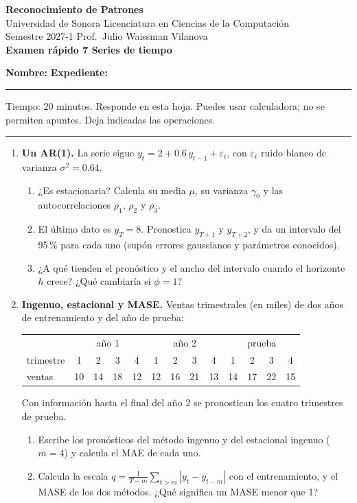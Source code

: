 \documentclass[11pt]{article}
\newcommand{\encabezado}[2]{%
\begin{center}
{\large\bfseries Reconocimiento de Patrones}\\[2pt]
Universidad de Sonora \textperiodcentered{} Licenciatura en Ciencias de la Computación\\
Semestre 2027-1 \textperiodcentered{} Prof.\ Julio Waissman Vilanova\\[10pt]
{\Large\bfseries #1}%
\ifdefined\tipodoc\\[4pt]{\large\itshape\tipodoc}\fi
\end{center}
\ifdefined\tipodoc\else
\vspace{6pt}
\textbf{Nombre:} \hrulefill\quad \textbf{Expediente:} \rule{3.5cm}{0.4pt}\par
\vspace{6pt}
\fi
#2
\par\medskip\hrule\medskip
}
\newcommand{\espacio}[1]{\par\vspace{#1}}
\newcommand{\nuevapagina}{\newpage}
\begin{document}
\encabezado{Examen rápido 7 \textperiodcentered{} Series de tiempo}{%
Tiempo: 20 minutos. Responde en esta hoja. Puedes usar calculadora; no se permiten apuntes. Deja indicadas las operaciones.}

\begin{enumerate}

\item \textbf{Un AR(1).} La serie sigue $y_t = 2 + 0.6\, y_{t-1} + \varepsilon_t$, con $\varepsilon_t$ ruido blanco de varianza $\sigma^2 = 0.64$.
\begin{enumerate}
  \item ¿Es estacionaria? Calcula su media $\mu$, su varianza $\gamma_0$ y las autocorrelaciones $\rho_1$, $\rho_2$ y $\rho_3$.
  \espacio{3.2cm}

  \item El último dato es $y_T = 8$. Pronostica $y_{T+1}$ y $y_{T+2}$, y da un intervalo del 95\,\% para cada uno (supón errores gaussianos y parámetros conocidos).
  \espacio{3.5cm}

  \item ¿A qué tienden el pronóstico y el ancho del intervalo cuando el horizonte $h$ crece? ¿Qué cambiaría si $\phi = 1$?
  \espacio{2.2cm}
\end{enumerate}

\nuevapagina
\item \textbf{Ingenuo, estacional y MASE.} Ventas trimestrales (en miles) de dos años de entrenamiento y del año de prueba:
\begin{center}
\begin{tabular}{l|cccc|cccc|cccc}
 & \multicolumn{4}{c|}{año 1} & \multicolumn{4}{c|}{año 2} & \multicolumn{4}{c}{prueba} \\
trimestre & 1 & 2 & 3 & 4 & 1 & 2 & 3 & 4 & 1 & 2 & 3 & 4 \\ \hline
ventas & 10 & 14 & 18 & 12 & 12 & 16 & 21 & 13 & 14 & 17 & 22 & 15
\end{tabular}
\end{center}
Con información hasta el final del año 2 se pronostican los cuatro trimestres de prueba.
\begin{enumerate}
  \item Escribe los pronósticos del método ingenuo y del estacional ingenuo ($m = 4$) y calcula el MAE de cada uno.
  \espacio{3cm}

  \item Calcula la escala $q = \frac{1}{T-m}\sum_{t > m} |y_t - y_{t-m}|$ con el entrenamiento, y el MASE de los dos métodos. ¿Qué significa un MASE menor que 1?
  \espacio{3cm}


\end{enumerate}
\end{enumerate}
\end{document}
